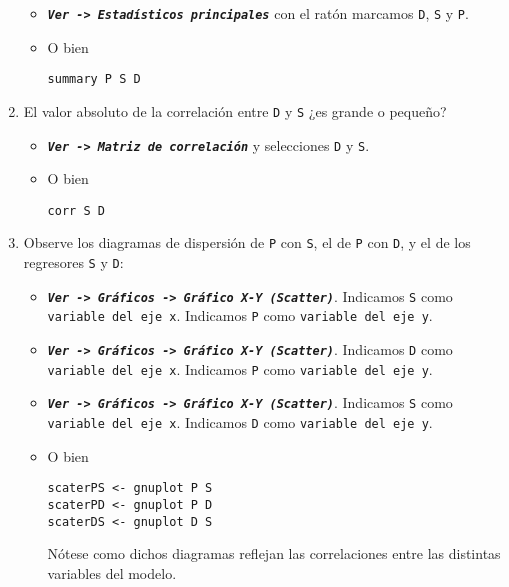 \documentclass[11pt]{article}
\begin{document}
\begin{enumerate}
\begin{itemize}
\item \textbf{\emph{\texttt{Ver -> Estadísticos principales}}} con el ratón marcamos \texttt{D},
\texttt{S} y \texttt{P}.

\item O bien 
\begin{verbatim}
summary P S D
\end{verbatim}
\end{itemize}

\item El valor absoluto de la correlación entre \texttt{D} y \texttt{S} ¿es grande o
pequeño?

\begin{itemize}
\item \textbf{\emph{\texttt{Ver -> Matriz de correlación}}} y selecciones \texttt{D} y \texttt{S}.

\item O bien 
\begin{verbatim}
corr S D
\end{verbatim}
\end{itemize}

\item Observe los diagramas de dispersión de \texttt{P} con \texttt{S}, el de \texttt{P} con
\texttt{D}, y el de los regresores \texttt{S} y \texttt{D}:

\begin{itemize}
\item \textbf{\emph{\texttt{Ver -> Gráficos -> Gráfico X-Y (Scatter)}}}. Indicamos \texttt{S} como \texttt{variable del eje x}. Indicamos \texttt{P} como \texttt{variable del eje y}.

\item \textbf{\emph{\texttt{Ver -> Gráficos -> Gráfico X-Y (Scatter)}}}. Indicamos \texttt{D} como \texttt{variable del eje x}. Indicamos \texttt{P} como \texttt{variable del eje y}.

\item \textbf{\emph{\texttt{Ver -> Gráficos -> Gráfico X-Y (Scatter)}}}. Indicamos \texttt{S} como \texttt{variable del eje x}. Indicamos \texttt{D} como \texttt{variable del eje y}.

\item O bien 
\begin{verbatim}
scaterPS <- gnuplot P S
scaterPD <- gnuplot P D
scaterDS <- gnuplot D S
\end{verbatim}

Nótese como dichos diagramas reflejan las correlaciones entre las distintas variables del modelo.
\end{itemize}


\end{enumerate}
\end{document}
